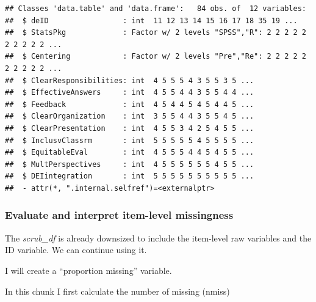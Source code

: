 \documentclass[
  11pt,
]{book}
\newenvironment{Shaded}{\begin{snugshade}}{\end{snugshade}}
\newcommand{\AttributeTok}[1]{\textcolor[rgb]{0.27,0.27,0.27}{#1}}
\newcommand{\CommentTok}[1]{\textcolor[rgb]{0.37,0.37,0.37}{\textit{#1}}}
\newcommand{\DecValTok}[1]{\textcolor[rgb]{0.06,0.06,0.06}{#1}}
\newcommand{\FunctionTok}[1]{\textcolor[rgb]{0.27,0.27,0.27}{\textbf{#1}}}
\newcommand{\NormalTok}[1]{#1}
\newcommand{\OtherTok}[1]{\textcolor[rgb]{0.37,0.37,0.37}{#1}}
\newcommand{\SpecialCharTok}[1]{\textcolor[rgb]{0.43,0.43,0.43}{\textbf{#1}}}
\begin{document}
\begin{verbatim}
## Classes 'data.table' and 'data.frame':   84 obs. of  12 variables:
##  $ deID                 : int  11 12 13 14 15 16 17 18 35 19 ...
##  $ StatsPkg             : Factor w/ 2 levels "SPSS","R": 2 2 2 2 2 2 2 2 2 2 ...
##  $ Centering            : Factor w/ 2 levels "Pre","Re": 2 2 2 2 2 2 2 2 2 2 ...
##  $ ClearResponsibilities: int  4 5 5 5 4 3 5 5 3 5 ...
##  $ EffectiveAnswers     : int  4 5 5 4 4 3 5 5 4 4 ...
##  $ Feedback             : int  4 5 4 4 5 4 5 4 4 5 ...
##  $ ClearOrganization    : int  3 5 5 4 4 3 5 5 4 5 ...
##  $ ClearPresentation    : int  4 5 5 3 4 2 5 4 5 5 ...
##  $ InclusvClassrm       : int  5 5 5 5 5 4 5 5 5 5 ...
##  $ EquitableEval        : int  4 5 5 5 4 4 5 4 5 5 ...
##  $ MultPerspectives     : int  4 5 5 5 5 5 5 4 5 5 ...
##  $ DEIintegration       : int  5 5 5 5 5 5 5 5 5 5 ...
##  - attr(*, ".internal.selfref")=<externalptr>
\end{verbatim}

\hypertarget{evaluate-and-interpret-item-level-missingness}{%
\subsubsection*{Evaluate and interpret item-level missingness}\label{evaluate-and-interpret-item-level-missingness}}


The \emph{scrub\_df} is already downsized to include the item-level raw variables and the ID variable. We can continue using it.

I will create a ``proportion missing'' variable.

In this chunk I first calculate the number of missing (nmiss)

\begin{Shaded}
\end{Shaded}
\end{document}
